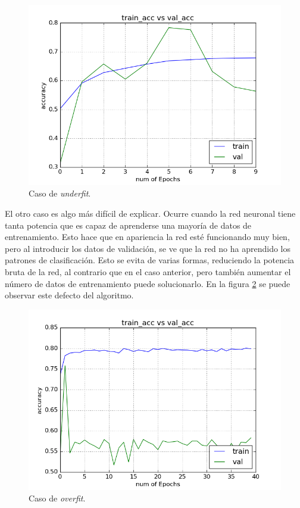 \documentclass[12pt]{book}
\numberwithin{equation}{section}
\begin{document}
\begin{figure}[h]
    \centering
    \includegraphics[scale=0.7]{underfit.png}
    \caption{Caso de \textit{underfit}.}
    \label{fig:underfit}
\end{figure}

El otro caso es algo más difícil de explicar. Ocurre cuando la red neuronal tiene tanta potencia que es capaz de aprenderse una mayoría de datos de entrenamiento. Esto hace que en apariencia la red esté funcionando muy bien, pero al introducir los datos de validación, se ve que la red no ha aprendido los patrones de clasificación. Esto se evita de varias formas, reduciendo la potencia bruta de la red, al contrario que en el caso anterior, pero también aumentar el número de datos de entrenamiento puede solucionarlo. En la figura \ref{fig:overfit} se puede observar este defecto del algoritmo.

\begin{figure}[h]
    \centering
    \includegraphics[scale=0.7]{overfit.png}
    \caption{Caso de \textit{overfit}.}
    \label{fig:overfit}
\end{figure}
\end{document}
